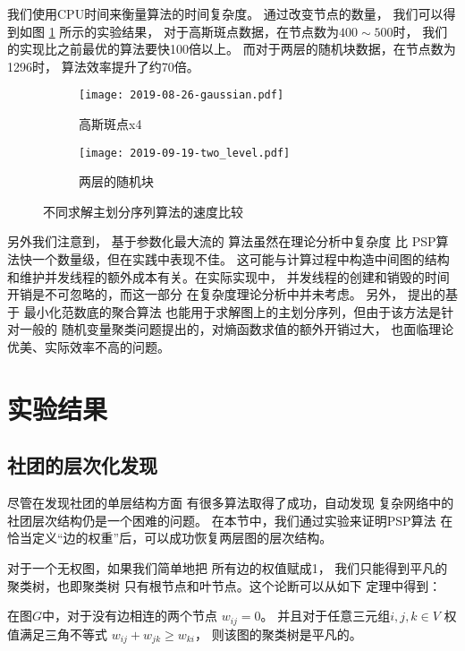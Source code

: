我们使用CPU时间来衡量算法的时间复杂度。
通过改变节点的数量，
我们可以得到如图 \ref{fig:esc} 所示的实验结果，
对于高斯斑点数据，在节点数为$400\sim 500$时，
我们的实现比之前最优的算法要快100倍以上。
而对于两层的随机块数据，在节点数为1296时，
算法效率提升了约70倍。
\begin{figure}
	\centering
	\begin{subfigure}{0.45\textwidth}
		\texttt{[image: 2019-08-26-gaussian.pdf]}
    \caption{高斯斑点x4}
	\end{subfigure}
	\begin{subfigure}{0.45\textwidth}
		\texttt{[image: 2019-09-19-two\_level.pdf]}
    \caption{两层的随机块}
	\end{subfigure}
	\caption{
  不同求解主划分序列算法的速度比较}\label{fig:esc}
\end{figure}

另外我们注意到，
基于参数化最大流的
算法\citep{kolmogorov}虽然在理论分析中复杂度
比 PSP算法快一个数量级，但在实践中表现不佳。
这可能与计算过程中构造中间图的结构
和维护并发线程的额外成本有关。在实际实现中，
并发线程的创建和销毁的时间开销是不可忽略的，而这一部分
在复杂度理论分析中并未考虑。
另外，\citet{chan2020agglomerative} 提出的基于 最小化范数底的聚合算法
也能用于求解图上的主划分序列，但由于该方法是针对一般的
随机变量聚类问题提出的，对熵函数求值的额外开销过大，
也面临理论优美、实际效率不高的问题。

\section{实验结果}\label{sec:hierarchical_experiment}
\subsection{社团的层次化发现}
\label{subsec:cd}
尽管在发现社团的单层结构方面
有很多算法取得了成功，自动发现
复杂网络中的社团层次结构仍是一个困难的问题。
在本节中，我们通过实验来证明PSP算法
在恰当定义“边的权重”后，可以成功恢复两层图的层次结构。

对于一个无权图，如果我们简单地把
所有边的权值赋成1，
我们只能得到平凡的聚类树，也即聚类树
只有根节点和叶节点。这个论断可以从如下
定理中得到：
\begin{theorem}\label{thm:triangle}
  在图$G$中，对于没有边相连的两个节点 $w_{ij}=0$。
  并且对于任意三元组$i,j,k \in V$ 权值满足三角不等式 
  $w_{ij} + w_{jk} \geq w_{ki}$，
  则该图的聚类树是平凡的。
\end{theorem}
  
